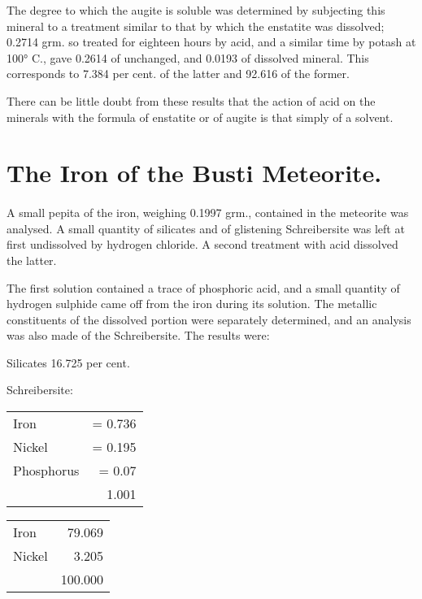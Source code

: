 \documentclass[a4paper, 12pt, oneside]{article}
\begin{document}
The degree to which the augite is soluble was determined by subjecting this mineral to a treatment similar to that by which the enstatite was dissolved; 0.2714 grm. so treated for eighteen hours by acid, and a similar time by potash at 100° C., gave 0.2614 of unchanged, and 0.0193 of dissolved mineral. This corresponds to 7.384 per cent. of the latter and 92.616 of the former.

There can be little doubt from these results that the action of acid on the minerals with the formula of enstatite or of augite is that simply of a solvent.
\clearpage
\section{The Iron of the Busti Meteorite.}
\paragraph{}
A small pepita of the iron, weighing 0.1997 grm., contained in the meteorite was analysed. A small quantity of silicates and of glistening Schreibersite was left at first undissolved by hydrogen chloride. A second treatment with acid dissolved the latter.

The first solution contained a trace of phosphoric acid, and a small quantity of hydrogen sulphide came off from the iron during its solution. The metallic constituents of the dissolved portion were separately determined, and an analysis was also made of the Schreibersite. The results were:
\begin{center}
Silicates 16.725 per cent.    
\end{center}
\begin{center}
Schreibersite:
\end{center}
\begin{table}[H]
    \centering
    \footnotesize
    \begin{tabular}{l r}
        Iron & = 0.736 \\
        Nickel & = 0.195 \\
        Phosphorus & = 0.07 \\ \hline
        ~ & 1.001 \\
    \end{tabular}
\end{table}
\begin{table}[H]
    \centering
    \footnotesize
    \begin{tabular}{l r}
        Iron & 79.069 \\
        Nickel & 3.205 \\ \hline
        ~ & 100.000 \\
    \end{tabular}
\end{table}
\end{document}
